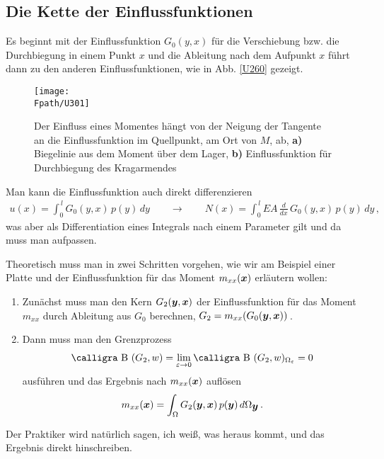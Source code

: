 {\textcolor{sectionTitleBlue}{\subsection{Die Kette der Einflussfunktionen }}}
Es beginnt mit der Einflussfunktion $G_0(y,x)$ f\"{u}r die Verschiebung bzw. die Durchbiegung in einem Punkt $x$ und die Ableitung nach dem Aufpunkt $x$ f\"{u}hrt dann zu den anderen Einflussfunktionen, wie in Abb. \ref{U260} gezeigt.
\begin{figure}[tbp]
\centering
\if {} \sidecaption \fi
\texttt{[image: \\Fpath/U301]}
\caption{Der Einfluss eines Momentes h\"{a}ngt von der Neigung der Tangente an die Einflussfunktion im Quellpunkt, am Ort von $M$, ab, \textbf{ a)} Biegelinie aus dem Moment \"{u}ber dem Lager, \textbf{ b)} Einflussfunktion f\"{u}r Durchbiegung des Kragarmendes} \label{U301}
%
\end{figure}%

Man kann die Einflussfunktion auch direkt differenzieren
\begin{align}
u(x) = \int_0^{\,l} G_0(y,x)\,p(y)\,dy \qquad \rightarrow \qquad N(x) = \int_0^{\,l} EA\,\frac{d}{dx}\,G_0(y,x)\,p(y)\,dy\,,
\end{align}
was aber als Differentiation eines Integrals nach einem Parameter gilt und da muss man aufpassen.

Theoretisch muss man in zwei Schritten vorgehen, wie wir am Beispiel einer Platte und der Einflussfunktion f\"{u}r das Moment $m_{xx}(\mbox{\boldmath $x$})$ erl\"{a}utern wollen:
\begin{enumerate}
  \item Zun\"{a}chst muss man den Kern $G_2(\mbox{\boldmath $y$},\mbox{\boldmath $x$})$ der Einflussfunktion f\"{u}r das Moment $m_{xx}$ durch Ableitung aus $G_0$ berechnen, $G_2 = m_{xx} (G_0(\mbox{\boldmath $y$},\mbox{\boldmath $x$}))$\,.
  \item Dann muss man den Grenzprozess
  \begin{align}
  \text{\normalfont\calligra B\,\,}(G_2,w) = \lim_{\varepsilon \to 0} \text{\normalfont\calligra B\,\,}(G_2,w)_{\Omega_\varepsilon} = 0
    \end{align}
    ausf\"{u}hren und das Ergebnis nach $m_{xx}(\mbox{\boldmath $x$})$ aufl\"{o}sen
    \begin{align}
    m_{xx}(\mbox{\boldmath $x$}) = \int_{\Omega} G_2(\mbox{\boldmath $y$},\mbox{\boldmath $x$})\,p(\mbox{\boldmath $y$})\,d\Omega_{\mbox{\boldmath $y$}}\,.
    \end{align}
\end{enumerate}
Der Praktiker wird nat\"{u}rlich sagen, \glq ich wei{\ss}, was heraus kommt\grq{}, und das Ergebnis direkt hinschreiben.

